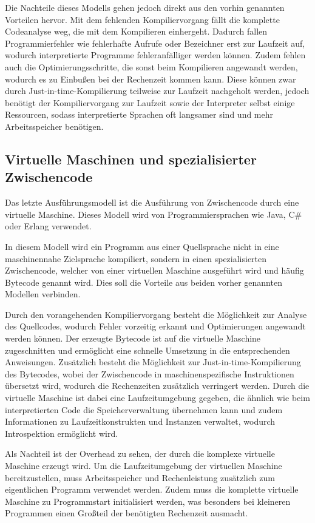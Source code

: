 \documentclass[11pt, parskip=half]{scrartcl}       %
\begin{document}
Die Nachteile dieses Modells gehen jedoch direkt aus den vorhin genannten Vorteilen hervor.
Mit dem fehlenden Kompiliervorgang fällt die komplette Codeanalyse weg, die mit dem Kompilieren einhergeht.
Dadurch fallen Programmierfehler wie fehlerhafte Aufrufe oder Bezeichner erst zur Laufzeit auf, wodurch interpretierte Programme fehleranfälliger werden können.
Zudem fehlen auch die Optimierungsschritte, die sonst beim Kompilieren angewandt werden, wodurch es zu Einbußen bei der Rechenzeit kommen kann.
Diese können zwar durch Just-in-time-Kompilierung teilweise zur Laufzeit nachgeholt werden, jedoch benötigt der Kompiliervorgang zur Laufzeit sowie der Interpreter selbst einige Ressourcen, sodass interpretierte Sprachen oft langsamer sind und mehr Arbeitsspeicher benötigen.\cite{stackoverflow_pros_and_cons_interpreted_languages}

\subsection{Virtuelle Maschinen und spezialisierter Zwischencode}

Das letzte Ausführungsmodell ist die Ausführung von Zwischencode durch eine virtuelle Maschine.
Dieses Modell wird von Programmiersprachen wie Java, C\# oder Erlang verwendet.

In diesem Modell wird ein Programm aus einer Quellsprache nicht in eine maschinennahe Zielsprache kompiliert, sondern in einen spezialisierten Zwischencode, welcher von einer virtuellen Maschine ausgeführt wird und häufig Bytecode genannt wird.
Dies soll die Vorteile aus beiden vorher genannten Modellen verbinden.

Durch den vorangehenden Kompiliervorgang besteht die Möglichkeit zur Analyse des Quellcodes, wodurch Fehler vorzeitig erkannt und Optimierungen angewandt werden können.
Der erzeugte Bytecode ist auf die virtuelle Maschine zugeschnitten und ermöglicht eine schnelle Umsetzung in die entsprechenden Anweisungen.
Zusätzlich besteht die Möglichkeit zur Just-in-time-Kompilierung des Bytecodes, wobei der Zwischencode in maschinenspezifische Instruktionen übersetzt wird, wodurch die Rechenzeiten zusätzlich verringert werden.
Durch die virtuelle Maschine ist dabei eine Laufzeitumgebung gegeben, die ähnlich wie beim interpretierten Code die Speicherverwaltung übernehmen kann und zudem Informationen zu Laufzeitkonstrukten und Instanzen verwaltet, wodurch Introspektion ermöglicht wird.

Als Nachteil ist der Overhead zu sehen, der durch die komplexe virtuelle Maschine erzeugt wird.
Um die Laufzeitumgebung der virtuellen Maschine bereitzustellen, muss Arbeitsspeicher und Rechenleistung zusätzlich zum eigentlichen Programm verwendet werden.
Zudem muss die komplette virtuelle Maschine zu Programmstart initialisiert werden, was besonders bei kleineren Programmen einen Großteil der benötigten Rechenzeit ausmacht.
\end{document}
